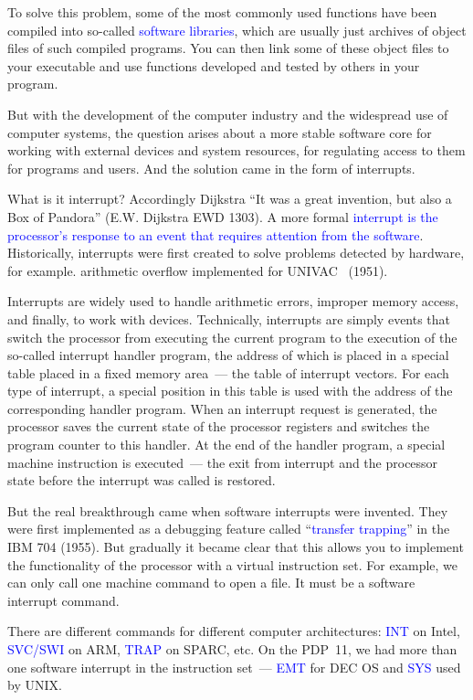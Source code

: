 \documentclass[12pt]{report}
\newcommand{\struct}[1]{\textcolor{blue}{#1}}
\newcommand{\Rim}[1]{\uppercase\expandafter{\romannumeral#1}}
\newcommand{\cmd}[1]{\textcolor{blue}{#1}}
\begin{document}
\medskip
To solve this problem, some of the most commonly used functions have been
compiled into so-called \struct{software libraries}, which are usually just
archives of object files of such compiled programs. You can then link
some of these object files to your executable and use functions developed
and tested by others in your program.

\medskip
But with the development of the computer industry and the widespread use
of computer systems, the question arises about a more stable software
core for working with external devices and system resources, for
regulating access to them for programs and users. And the solution came
in the form of interrupts.

\medskip
What is it interrupt? Accordingly Dijkstra ``It was a great invention, but
also a Box of Pandora'' (E.W. Dijkstra EWD 1303). A more formal \struct{interrupt is
the processor's response to an event that requires attention from the software}.
Historically, interrupts were first created to solve problems
detected by hardware, for example. arithmetic overflow implemented
for UNIVAC~\Rim{1} (1951).

\medskip
Interrupts are widely used to handle arithmetic errors, improper memory
access, and finally, to work with devices. Technically, interrupts are
simply events that switch the processor from executing the current
program to the execution of the so-called interrupt handler program,
the address of which is placed in a special table placed in a fixed memory
area~--- the table of interrupt vectors. For each type of interrupt,
a special position in this table is used with the address of the corresponding
handler program. When an interrupt request is generated, the processor saves
the current state of the processor registers and switches the program counter
to this handler. At the end of the handler program, a special machine
instruction is executed~--- the exit from interrupt and the processor state
before the interrupt was called is restored.

\medskip
But the real breakthrough came when software interrupts were invented.
They were first implemented as a debugging feature called ``\struct{transfer
trapping}'' in the IBM 704 (1955). But gradually it became clear that this
allows you to implement the functionality of the processor with a virtual
instruction set. For example, we can only call one machine command
to open a file. It must be a software interrupt command.

\medskip
There are different commands for different computer architectures:
\cmd{INT} on Intel, \cmd{SVC/SWI} on ARM, \cmd{TRAP} on SPARC, etc.
On the PDP~11, we had more than one software interrupt in the instruction set~---
\cmd{EMT} for DEC OS and \cmd{SYS} used by UNIX.
\end{document}
